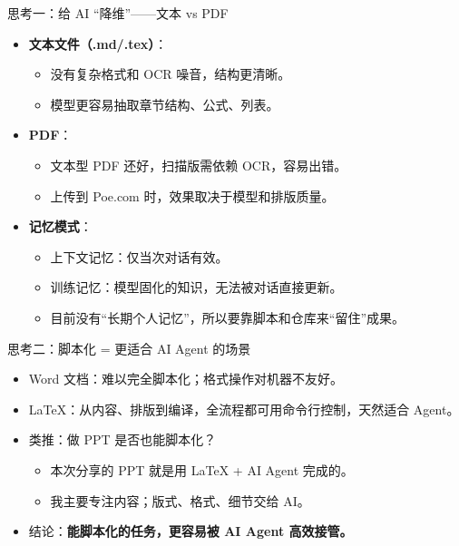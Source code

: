 \documentclass[aspectratio=169]{beamer}
\begin{document}
\begin{frame}{思考一：给 AI “降维”——文本 vs PDF}
  \begin{itemize}
    \item \textbf{文本文件（.md/.tex）}：
      \begin{itemize}
        \item 没有复杂格式和 OCR 噪音，结构更清晰。
        \item 模型更容易抽取章节结构、公式、列表。
      \end{itemize}
    \item \textbf{PDF}：
      \begin{itemize}
        \item 文本型 PDF 还好，扫描版需依赖 OCR，容易出错。
        \item 上传到 Poe.com 时，效果取决于模型和排版质量。
      \end{itemize}
    \item \textbf{记忆模式}：
      \begin{itemize}
        \item 上下文记忆：仅当次对话有效。
        \item 训练记忆：模型固化的知识，无法被对话直接更新。
        \item 目前没有“长期个人记忆”，所以要靠脚本和仓库来“留住”成果。
      \end{itemize}
  \end{itemize}
\end{frame}

\begin{frame}{思考二：脚本化 = 更适合 AI Agent 的场景}
  \begin{itemize}
    \item Word 文档：难以完全脚本化；格式操作对机器不友好。
    \item LaTeX：从内容、排版到编译，全流程都可用命令行控制，天然适合 Agent。
    \item 类推：做 PPT 是否也能脚本化？
      \begin{itemize}
        \item 本次分享的 PPT 就是用 LaTeX + AI Agent 完成的。
        \item 我主要专注内容；版式、格式、细节交给 AI。
      \end{itemize}
    \item 结论：\textbf{能脚本化的任务，更容易被 AI Agent 高效接管。}
  \end{itemize}
\end{frame}
\end{document}
